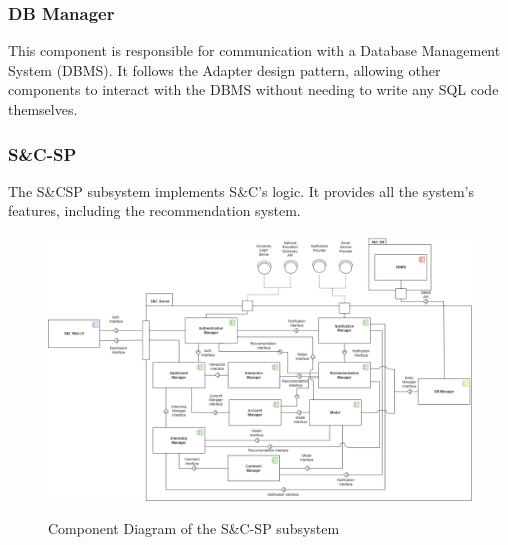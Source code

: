 \documentclass[a4paper,12pt]{article}
\begin{document}
\subsubsection{DB Manager}
This component is responsible for communication with a Database Management System (DBMS).
It follows the Adapter design pattern, allowing other components to interact with the DBMS
without needing to write any SQL code themselves.
\subsubsection{S\&C-SP}
The S\&CSP subsystem implements S\&C's logic. It provides all the system's features, including the recommendation system.
\begin{figure}%
\centering
\includegraphics[scale=0.50]{DD_figures/ComponentDiagram2-S&C.drawio.png}\\
\caption{Component Diagram of the S\&C-SP subsystem}
\end{figure}
\end{document}

